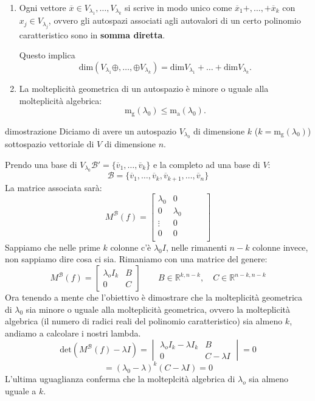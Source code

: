 \documentclass[x11names]{article}
\begin{document}
\begin{enumerate}
	\item Ogni vettore $\overline{x} \in V_{\lambda_{1}},\dots,V_{\lambda_{k}}$ si scrive in modo unico come $\overline{x}_{1} +, \dots,+ \overline{x}_{k}$ con $x_{j} \in V_{\lambda_{j}}$, ovvero gli autospazi associati agli autovalori di un certo polinomio caratteristico sono in \textbf{somma diretta}.

		\noindent
Questo implica 
\[
\text{dim}\left(V_{\lambda_{1}}\oplus,\dots,\oplus V_{\lambda_{k}}\right) = \text{dim}V_{\lambda_{1}} + \dots + \text{dim}V_{\lambda_{k}}
.\] 
\item La molteplicità geometrica di un autospazio è minore o uguale alla molteplicità algebrica:
	\[
	\text{m}_{\text{g}}\left(\lambda_{0}\right) \leq \text{m}_{\text{a}}\left(\lambda_{0}\right)
	.\] 
\end{enumerate}

\begin{es}{dimostrazione}
Diciamo di avere un autospazio $V_{\lambda_{0}}$ di dimensione $k$ ($k = \text{m}_{\text{g}}\left(\lambda_{0}\right)$) sottospazio vettoriale di $V$ di dimensione $n$.

\noindent
Prendo una base di $V_{\lambda_{0}} $$\mathscr{B}' = \{\overline{v}_{1},\dots,\overline{v}_{k}\}$ e la completo ad una base di $V$: 
\[
\mathscr{B} = \{\overline{v}_{1},\dots,\overline{v}_{k},\overline{v}_{k+1},\dots,\overline{v}_{n}\}
\] 
La matrice associata sarà:
\[
M^{\mathscr{B}}\left(f\right) = \begin{bmatrix}
     \lambda_{0}& 0 &  &  &\\
     0&\lambda_{0}  &  &  &\\
     \vdots& 0 &  &  &\\
     0& 0 &  &  &\\
\end{bmatrix}
\] 
Sappiamo che nelle prime $k$ colonne c'è $\lambda_{0}I$, nelle rimanenti $n-k$ colonne invece, non sappiamo dire cosa ci sia. Rimaniamo con una matrice del genere:
 \[
M^{\mathscr{B}}\left(f\right) = \begin{bmatrix}
    \lambda_{o}I_{k} & B \\
     0& C 
\end{bmatrix}
\qquad B \in \mathbb{R}^{k,n-k}, \quad C \in \mathbb{R}^{n-k,n-k}
\] 
Ora tenendo a mente che l'obiettivo è dimostrare che la molteplicità geometrica di $\lambda_{0}$ sia minore o uguale alla molteplicità geometrica, ovvero la molteplicità algebrica (il numero di radici reali del polinomio caratteristico) sia almeno $k$, andiamo a calcolare i nostri lambda.
\[
	 \text{det}\left(M^{\mathscr{B}}\left(f\right) - \lambda I\right) = 
	 \begin{vmatrix}
	\lambda_{o}I_{k} - \lambda I_{k} & B \\
     	0& C - \lambda I 
	\end{vmatrix} = 0
\] 
\[
= \left(\lambda_{0} - \lambda\right)^{k}\left(C-\lambda I\right) = 0
\] 
L'ultima uguaglianza conferma che la molteplcità algebrica di $\lambda_{o}$ sia almeno uguale a $k$.
\end{es}
\end{document}
